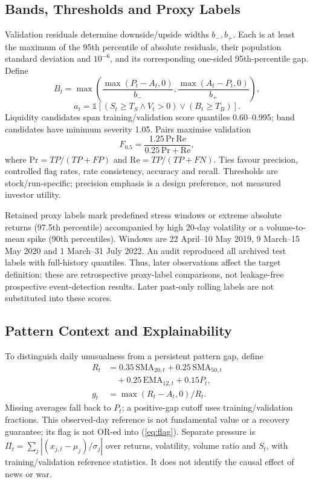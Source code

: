 \documentclass[conference]{IEEEtran}
\begin{document}
\subsection{Bands, Thresholds and Proxy Labels}
Validation residuals determine downside/upside widths $b_-,b_+$. Each is at least the maximum of the 95th percentile of absolute residuals, their population standard deviation and $10^{-6}$, and its corresponding one-sided 95th-percentile gap. Define
\begin{equation}
B_t=\max\left(\frac{\max(P_t-A_t,0)}{b_-},\frac{\max(A_t-P_t,0)}{b_+}\right),
\label{eq:band}
\end{equation}
\begin{equation}
a_t=\mathbb{1}\left[(S_t\ge T_S\land V_t>0)\lor(B_t\ge T_B)\right].
\label{eq:flag}
\end{equation}
Liquidity candidates span training/validation score quantiles 0.60--0.995; band candidates have minimum severity 1.05. Pairs maximise validation
\begin{equation}
F_{0.5}=\frac{1.25\,\mathrm{Pr}\,\mathrm{Re}}{0.25\,\mathrm{Pr}+\mathrm{Re}},
\label{eq:fbeta}
\end{equation}
where $\mathrm{Pr}=TP/(TP+FP)$ and $\mathrm{Re}=TP/(TP+FN)$. Ties favour precision, controlled flag rates, rate consistency, accuracy and recall. Thresholds are stock/run-specific; precision emphasis is a design preference, not measured investor utility.

Retained proxy labels mark predefined stress windows or extreme absolute returns (97.5th percentile) accompanied by high 20-day volatility or a volume-to-mean spike (90th percentiles). Windows are 22 April--10 May 2019, 9 March--15 May 2020 and 1 March--31 July 2022. An audit reproduced all archived test labels with full-history quantiles. Thus, later observations affect the target definition: these are retrospective proxy-label comparisons, not leakage-free prospective event-detection results. Later past-only rolling labels are not substituted into these scores.

\subsection{Pattern Context and Explainability}
To distinguish daily unusualness from a persistent pattern gap, define
\begin{align}
R_t&=0.35\,\mathrm{SMA}_{20,t}+0.25\,\mathrm{SMA}_{50,t}\nonumber\\
&\quad+0.25\,\mathrm{EMA}_{12,t}+0.15P_t,\\
g_t&=\max(R_t-A_t,0)/R_t.
\label{eq:pattern}
\end{align}
Missing averages fall back to $P_t$; a positive-gap cutoff uses training/validation fractions. This observed-day reference is not fundamental value or a recovery guarantee; its flag is not OR-ed into (\ref{eq:flag}). Separate pressure is $\Pi_t=\sum_j|(x_{j,t}-\mu_j)/\sigma_j|$ over returns, volatility, volume ratio and $S_t$, with training/validation reference statistics. It does not identify the causal effect of news or war.
\end{document}
